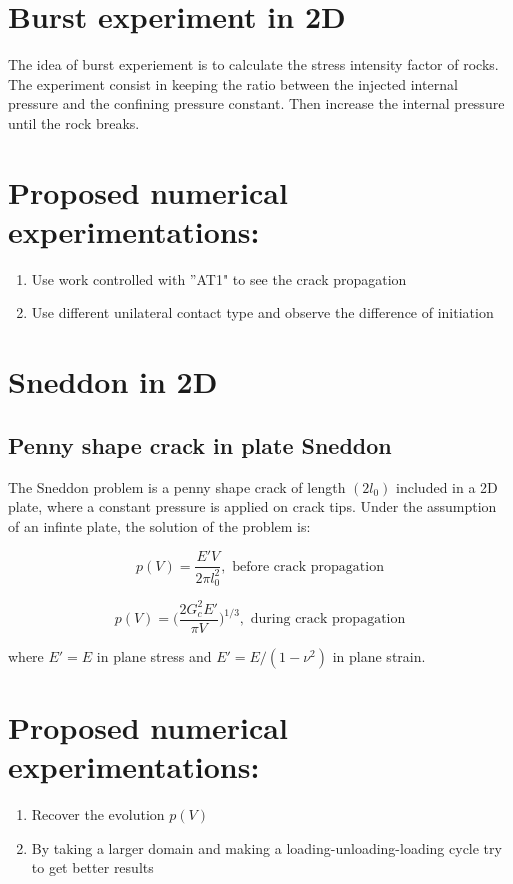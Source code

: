 \documentclass[10pt,oneside]{memoir}
\begin{document}
\section{Burst experiment in 2D}
The idea of burst experiement is to calculate the stress intensity factor of rocks. The experiment consist in keeping the ratio between the injected internal pressure and the confining pressure constant. Then increase the internal pressure until the rock breaks.

\section*{Proposed numerical experimentations:}
\begin{enumerate}
\item Use work controlled with ”AT1" to see the crack propagation
\item Use different unilateral contact type and observe the difference of initiation
\end{enumerate}

\section{Sneddon in 2D}

\subsection{Penny shape crack in plate Sneddon}
The Sneddon problem is a penny shape crack of length $(2 l_0)$ included in a 2D plate, where a constant pressure is applied on crack tips. Under the assumption of an infinte plate, the solution of the problem is:

$$ p(V) = \frac{E'V}{2\pi l_0^2}, \text{  before crack propagation}$$

$$ p(V) = \Big( \frac{2G_c^2 E'}{\pi V} \Big)^{1/3}, \text{  during crack propagation}$$

where $E'=E$ in plane stress and $E'=E/(1-\nu^2)$ in plane strain.

\section*{Proposed numerical experimentations:}
\begin{enumerate}
\item Recover the evolution $p(V)$
\item By taking a larger domain and making a loading-unloading-loading cycle try to get better results
\end{enumerate}
\end{document}
